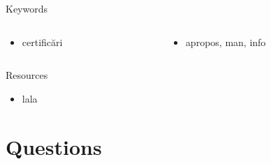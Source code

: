 \documentclass{workshop}
\begin{document}
\begin{frame}{Keywords}
  \begin{columns}
    \begin{column}[l]{0.5\textwidth}
      \begin{itemize}
        \item certificări
      \end{itemize}
    \end{column}
    \begin{column}[l]{0.5\textwidth}
      \begin{itemize}
        \item apropos, man, info
      \end{itemize}
    \end{column}
  \end{columns}
\end{frame}

\begin{frame}{Resources}
  \begin{itemize}
  \item lala
  \end{itemize}
\end{frame}

\section{Questions}
\end{document}
